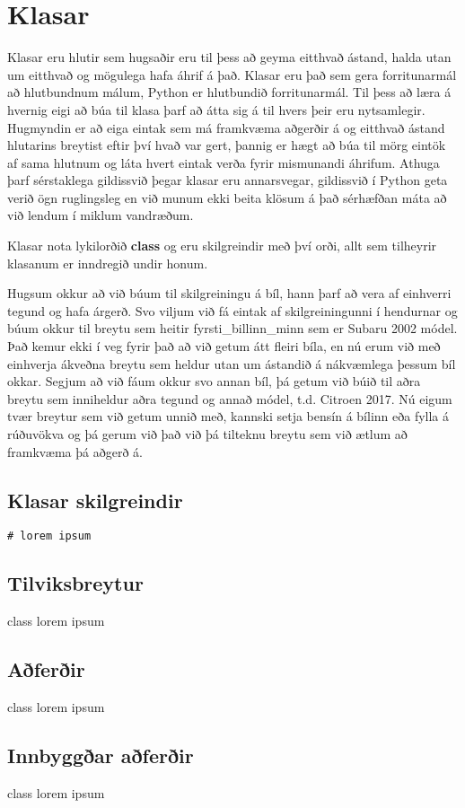 
\chapter{Klasar}\label{k:klasar}
Klasar eru hlutir sem hugsaðir eru til þess að geyma eitthvað ástand, halda utan um eitthvað og mögulega hafa áhrif á það.
Klasar eru það sem gera forritunarmál að hlutbundnum málum, Python er hlutbundið forritunarmál.
Til þess að læra á hvernig eigi að búa til klasa þarf að átta sig á til hvers þeir eru nytsamlegir.
Hugmyndin er að eiga eintak sem má framkvæma aðgerðir á og eitthvað ástand hlutarins breytist eftir því hvað var gert, þannig er hægt að búa til mörg eintök af sama hlutnum og láta hvert eintak verða fyrir mismunandi áhrifum.
Athuga þarf sérstaklega gildissvið þegar klasar eru annarsvegar, gildissvið í Python geta verið ögn ruglingsleg en við munum ekki beita klösum á það sérhæfðan máta að við lendum í miklum vandræðum.

Klasar nota lykilorðið \textbf{class} og eru skilgreindir með því orði, allt sem tilheyrir klasanum er inndregið undir honum.

Hugsum okkur að við búum til skilgreiningu á bíl, hann þarf að vera af einhverri tegund og hafa árgerð.
Svo viljum við fá eintak af skilgreiningunni í hendurnar og búum okkur til breytu sem heitir fyrsti\_billinn\_minn sem er Subaru 2002 módel.
Það kemur ekki í veg fyrir það að við getum átt fleiri bíla, en nú erum við með einhverja ákveðna breytu sem heldur utan um ástandið á nákvæmlega þessum bíl okkar.
Segjum að við fáum okkur svo annan bíl, þá getum við búið til aðra breytu sem inniheldur aðra tegund og annað módel, t.d. Citroen 2017.
Nú eigum tvær breytur sem við getum unnið með, kannski setja bensín á bílinn eða fylla á rúðuvökva og þá gerum við það við þá tilteknu breytu sem við ætlum að framkvæma þá aðgerð á.

\section{Klasar skilgreindir}\label{uk:klasar-skilgreindir}


\begin{lstlisting}[caption=Klasar skilgreindir, label=lst:klasar-skilgreindir]
# lorem ipsum
\end{lstlisting}

\section{Tilviksbreytur}\label{uk:klasar-tilviksbreytur}
class lorem ipsum

\section{Aðferðir}\label{uk:klasar-aðferðir}
class lorem ipsum

\section{Innbyggðar aðferðir}\label{uk:klasar-innbyggðar-aðferðir}
class lorem ipsum